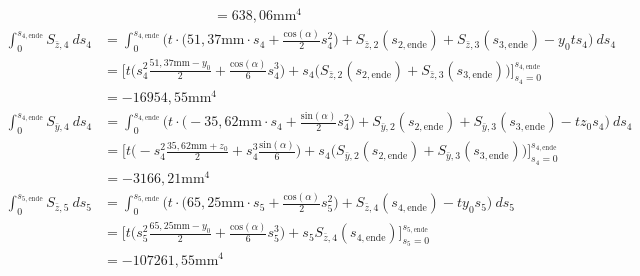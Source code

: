 \begin{itemize}
\begin{equation}
\begin{split}
			&=638,06\mathrm{mm}^4
		\end{split}
	\end{equation}
	\begin{equation}
		\begin{split}
			\int_{0}^{s_{4,\mathrm{ende}}} S_{\bar z,4}\ ds_4 &= \int_{0}^{s_{4,\mathrm{ende}}} \bigg(t\cdot\bigg(51,37\mathrm{mm}\cdot s_4 + \frac{\mathrm{cos}(\alpha)}{2}s^2_4\bigg) + S_{\bar z,2}(s_{2,\mathrm{ende}})  + S_{\bar z,3}(s_{3,\mathrm{ende}})-y_0ts_4\bigg)\ ds_4\\\
			&= \bigg[t\bigg(s_4^2\frac{51,37\mathrm{mm}-y_0}{2}+\frac{\mathrm{cos}(\alpha)}{6}s_4^3\bigg)+s_4\bigg(S_{\bar z,2}(s_{2,\mathrm{ende}})  + S_{\bar z,3}(s_{3,\mathrm{ende}})\bigg)\bigg]_{s_4=0}^{s_{4,\mathrm{ende}}}\\\
			&=-16954,55\mathrm{mm}^4
		\end{split}
	\end{equation}
	\begin{equation}
		\begin{split}
			 \int_{0}^{s_{4,\mathrm{ende}}} S_{\bar y,4}\ ds_4 &= \int_{0}^{s_{4,\mathrm{ende}}} \bigg(t\cdot\bigg(-35,62\mathrm{mm}\cdot s_4 + \frac{\mathrm{sin}(\alpha)}{2}s^2_4\bigg) + S_{\bar y,2}(s_{2,\mathrm{ende}})  + S_{\bar y,3}(s_{3,\mathrm{ende}})-tz_0s_4\bigg)\ ds_4\\\
			 &=\bigg[t\bigg(-s_4^2\frac{35,62\mathrm{mm}+z_0}{2}+s_4^3\frac{\mathrm{sin}(\alpha)}{6}\bigg)+ s_4\bigg(S_{\bar y,2}(s_{2,\mathrm{ende}})  + S_{\bar y,3}(s_{3,\mathrm{ende}})\bigg)\bigg]_{s_4=0}^{s_{4,\mathrm{ende}}}\\\
			 &=-3166,21\mathrm{mm}^4
		\end{split}
	\end{equation}
	\begin{equation}
		\begin{split}
			\int_{0}^{s_{5,\mathrm{ende}}} S_{\bar z,5}\ ds_5 &= \int_{0}^{s_{5,\mathrm{ende}}} \bigg(t\cdot\bigg(65,25\mathrm{mm}\cdot s_5 +\frac{\mathrm{cos}(\alpha)}{2}s^2_5\bigg) + S_{\bar z,4}(s_{4,\mathrm{ende}})-ty_0s_5\bigg)\ ds_5\\\
			&= \bigg[t\bigg(s_5^2\frac{65,25\mathrm{mm}-y_0}{2}+\frac{\mathrm{cos}(\alpha)}{6}s^3_5\bigg)+s_5S_{\bar z,4}(s_{4,\mathrm{ende}})\bigg]_{s_5=0}^{s_{5,\mathrm{ende}}}\\\
			&=-107261,55\mathrm{mm}^4
		\end{split}
	\end{equation}
	\begin{equation}
		\begin{split}

\end{split}
\end{equation}
\end{itemize}
